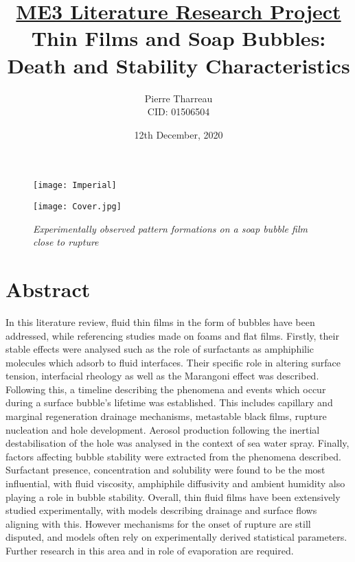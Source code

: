 \documentclass[a4paper,12pt]{article}
\numberwithin{equation}{section}
\numberwithin{figure}{section}
\numberwithin{table}{section}
\begin{document}
\begin{figure} [t]
    \texttt{[image: Imperial]}
\end{figure}



\title{\large \underline{ME3 Literature Research Project} \\ \huge Thin Films and Soap Bubbles: Death and Stability Characteristics}

\date{12th December, 2020}
\author{Pierre Tharreau \\ CID: 01506504}
\maketitle

\begin{figure} [h]
    \centering
    \captionsetup{width=.9\linewidth}
    \texttt{[image: Cover.jpg]}
    \caption*{\textit{Experimentally observed pattern formations on a soap bubble film close to rupture \cite{Shen2020}}}
\end{figure}


\newpage
{}

\section*{Abstract}
In this literature review, fluid thin films in the form of bubbles have been addressed, while referencing studies made on foams and flat films. Firstly, their stable effects were analysed such as the role of surfactants as amphiphilic molecules which adsorb to fluid interfaces. Their specific role in altering surface tension, interfacial rheology as well as the Marangoni effect was described. Following this, a timeline describing the phenomena and events which occur during a surface bubble's lifetime was established. This includes capillary and marginal regeneration drainage mechanisms, metastable black films, rupture nucleation and hole development. Aerosol production following the inertial destabilisation of the hole was analysed in the context of sea water spray. Finally, factors affecting bubble stability were extracted from the phenomena described. Surfactant presence, concentration and solubility  were found to be the most influential, with fluid viscosity, amphiphile diffusivity and ambient humidity also playing a role in bubble stability. Overall, thin fluid films have been extensively studied experimentally, with models describing drainage and surface flows aligning with this. However mechanisms for the onset of rupture are still disputed, and models often rely on experimentally derived statistical parameters. Further research in this area and in role of evaporation are required.
\end{document}
